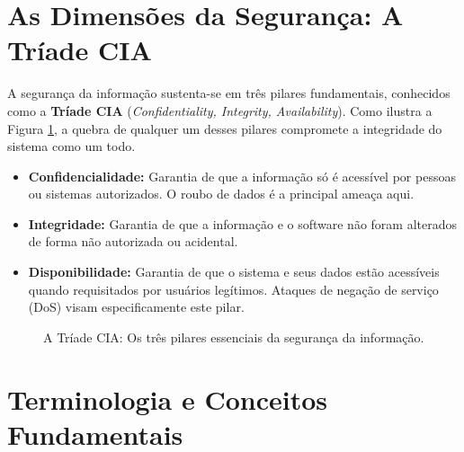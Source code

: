 \documentclass[12pt,a4paper,twoside]{report}
\begin{document}
\section{As Dimensões da Segurança: A Tríade CIA}

A segurança da informação sustenta-se em três pilares fundamentais, conhecidos como a \textbf{Tríade CIA} (\emph{Confidentiality, Integrity, Availability}). Como ilustra a Figura \ref{fig:triade_cia}, a quebra de qualquer um desses pilares compromete a integridade do sistema como um todo.

\begin{itemize}
    \item \textbf{Confidencialidade:} Garantia de que a informação só é acessível por pessoas ou sistemas autorizados. O roubo de dados é a principal ameaça aqui.
    \item \textbf{Integridade:} Garantia de que a informação e o software não foram alterados de forma não autorizada ou acidental.
    \item \textbf{Disponibilidade:} Garantia de que o sistema e seus dados estão acessíveis quando requisitados por usuários legítimos. Ataques de negação de serviço (DoS) visam especificamente este pilar.
\end{itemize}

\begin{figure}[h]
    \centering
    \caption{A Tríade CIA: Os três pilares essenciais da segurança da informação.}
    \label{fig:triade_cia}
\end{figure}

\section{Terminologia e Conceitos Fundamentais}
\end{document}
